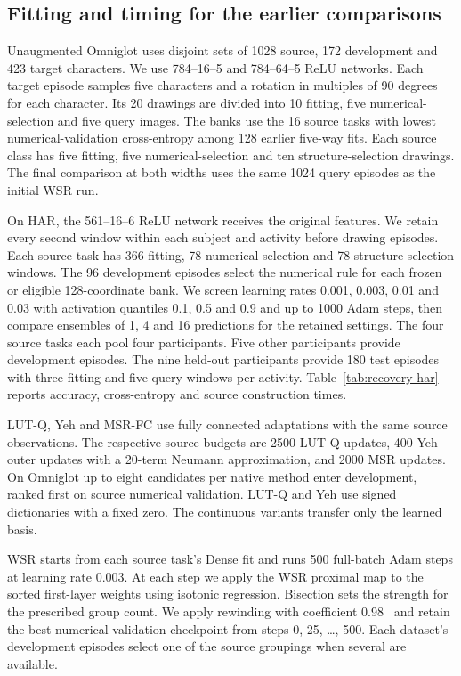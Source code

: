 \subsection{Fitting and timing for the earlier comparisons}
\label{app:asrr-tuning-details}

Unaugmented Omniglot uses disjoint sets of 1028 source, 172 development and 423
target characters. We use 784--16--5 and 784--64--5 ReLU networks. Each target
episode samples five characters and a rotation in multiples of 90
degrees for each character. Its 20 drawings are divided into 10 fitting,
five numerical-selection and five query images. The banks use the 16
source tasks with lowest numerical-validation cross-entropy among 128
earlier five-way fits. Each source class has five fitting, five
numerical-selection and ten structure-selection drawings. The final
comparison at both widths uses the same 1024 query episodes as the initial
WSR run.

On HAR, the 561--16--6 ReLU network receives the original features.
We retain every second window within each subject and activity before
drawing episodes. Each source task has 366 fitting, 78 numerical-selection
and 78 structure-selection windows. The 96 development episodes select
the numerical rule for each frozen or eligible 128-coordinate bank.
We screen learning rates 0.001, 0.003, 0.01 and 0.03 with activation
quantiles 0.1, 0.5 and 0.9 and up to 1000 Adam steps, then compare
ensembles of 1, 4 and 16 predictions for the retained settings.
The four source tasks each pool four participants. Five other
participants provide development episodes. The nine held-out
participants provide 180 test episodes with three fitting and five
query windows per activity. Table~\ref{tab:recovery-har} reports
accuracy, cross-entropy and source construction times.


LUT-Q, Yeh and MSR-FC use fully connected adaptations with the same
source observations. The respective source budgets are 2500 LUT-Q
updates, 400 Yeh outer updates with a 20-term Neumann approximation,
and 2000 MSR updates. On Omniglot up to eight candidates per native
method enter development, ranked first on source numerical validation.
LUT-Q and Yeh use signed dictionaries with a fixed zero. The continuous
variants transfer only the learned basis.

WSR starts from each source task's Dense fit and runs 500 full-batch
Adam steps at learning rate 0.003. At each step we apply the WSR proximal
map to the sorted first-layer weights using isotonic regression. Bisection
sets the strength for the prescribed group count. We apply rewinding
with coefficient 0.98~\cite{shakerinava2024weight} and retain the best
numerical-validation checkpoint from steps 0, 25, \ldots, 500. Each
dataset's development episodes select one of the source groupings when
several are available.

